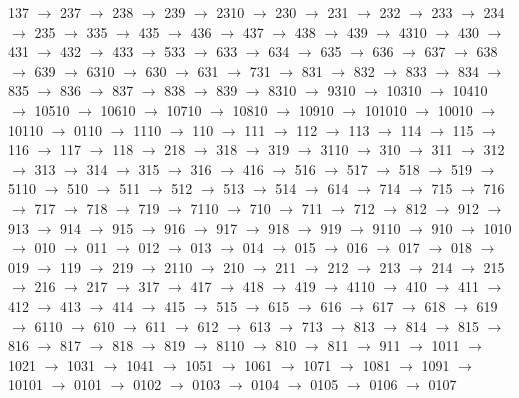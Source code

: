 137 $\rightarrow$ 237 $\rightarrow$ 238 $\rightarrow$ 239 $\rightarrow$ 2310 $\rightarrow$ 230 $\rightarrow$ 231 $\rightarrow$ 232 $\rightarrow$ 233 $\rightarrow$ 234 $\rightarrow$ 235 $\rightarrow$ 335 $\rightarrow$ 435 $\rightarrow$ 436 $\rightarrow$ 437 $\rightarrow$ 438 $\rightarrow$ 439 $\rightarrow$ 4310 $\rightarrow$ 430 $\rightarrow$ 431 $\rightarrow$ 432 $\rightarrow$ 433 $\rightarrow$ 533 $\rightarrow$ 633 $\rightarrow$ 634 $\rightarrow$ 635 $\rightarrow$ 636 $\rightarrow$ 637 $\rightarrow$ 638 $\rightarrow$ 639 $\rightarrow$ 6310 $\rightarrow$ 630 $\rightarrow$ 631 $\rightarrow$ 731 $\rightarrow$ 831 $\rightarrow$ 832 $\rightarrow$ 833 $\rightarrow$ 834 $\rightarrow$ 835 $\rightarrow$ 836 $\rightarrow$ 837 $\rightarrow$ 838 $\rightarrow$ 839 $\rightarrow$ 8310 $\rightarrow$ 9310 $\rightarrow$ 10310 $\rightarrow$ 10410 $\rightarrow$ 10510 $\rightarrow$ 10610 $\rightarrow$ 10710 $\rightarrow$ 10810 $\rightarrow$ 10910 $\rightarrow$ 101010 $\rightarrow$ 10010 $\rightarrow$ 10110 $\rightarrow$ 0110 $\rightarrow$ 1110 $\rightarrow$ 110 $\rightarrow$ 111 $\rightarrow$ 112 $\rightarrow$ 113 $\rightarrow$ 114 $\rightarrow$ 115 $\rightarrow$ 116 $\rightarrow$ 117 $\rightarrow$ 118 $\rightarrow$ 218 $\rightarrow$ 318 $\rightarrow$ 319 $\rightarrow$ 3110 $\rightarrow$ 310 $\rightarrow$ 311 $\rightarrow$ 312 $\rightarrow$ 313 $\rightarrow$ 314 $\rightarrow$ 315 $\rightarrow$ 316 $\rightarrow$ 416 $\rightarrow$ 516 $\rightarrow$ 517 $\rightarrow$ 518 $\rightarrow$ 519 $\rightarrow$ 5110 $\rightarrow$ 510 $\rightarrow$ 511 $\rightarrow$ 512 $\rightarrow$ 513 $\rightarrow$ 514 $\rightarrow$ 614 $\rightarrow$ 714 $\rightarrow$ 715 $\rightarrow$ 716 $\rightarrow$ 717 $\rightarrow$ 718 $\rightarrow$ 719 $\rightarrow$ 7110 $\rightarrow$ 710 $\rightarrow$ 711 $\rightarrow$ 712 $\rightarrow$ 812 $\rightarrow$ 912 $\rightarrow$ 913 $\rightarrow$ 914 $\rightarrow$ 915 $\rightarrow$ 916 $\rightarrow$ 917 $\rightarrow$ 918 $\rightarrow$ 919 $\rightarrow$ 9110 $\rightarrow$ 910 $\rightarrow$ 1010 $\rightarrow$ 010 $\rightarrow$ 011 $\rightarrow$ 012 $\rightarrow$ 013 $\rightarrow$ 014 $\rightarrow$ 015 $\rightarrow$ 016 $\rightarrow$ 017 $\rightarrow$ 018 $\rightarrow$ 019 $\rightarrow$ 119 $\rightarrow$ 219 $\rightarrow$ 2110 $\rightarrow$ 210 $\rightarrow$ 211 $\rightarrow$ 212 $\rightarrow$ 213 $\rightarrow$ 214 $\rightarrow$ 215 $\rightarrow$ 216 $\rightarrow$ 217 $\rightarrow$ 317 $\rightarrow$ 417 $\rightarrow$ 418 $\rightarrow$ 419 $\rightarrow$ 4110 $\rightarrow$ 410 $\rightarrow$ 411 $\rightarrow$ 412 $\rightarrow$ 413 $\rightarrow$ 414 $\rightarrow$ 415 $\rightarrow$ 515 $\rightarrow$ 615 $\rightarrow$ 616 $\rightarrow$ 617 $\rightarrow$ 618 $\rightarrow$ 619 $\rightarrow$ 6110 $\rightarrow$ 610 $\rightarrow$ 611 $\rightarrow$ 612 $\rightarrow$ 613 $\rightarrow$ 713 $\rightarrow$ 813 $\rightarrow$ 814 $\rightarrow$ 815 $\rightarrow$ 816 $\rightarrow$ 817 $\rightarrow$ 818 $\rightarrow$ 819 $\rightarrow$ 8110 $\rightarrow$ 810 $\rightarrow$ 811 $\rightarrow$ 911 $\rightarrow$ 1011 $\rightarrow$ 1021 $\rightarrow$ 1031 $\rightarrow$ 1041 $\rightarrow$ 1051 $\rightarrow$ 1061 $\rightarrow$ 1071 $\rightarrow$ 1081 $\rightarrow$ 1091 $\rightarrow$ 10101 $\rightarrow$ 0101 $\rightarrow$ 0102 $\rightarrow$ 0103 $\rightarrow$ 0104 $\rightarrow$ 0105 $\rightarrow$ 0106 $\rightarrow$ 0107 